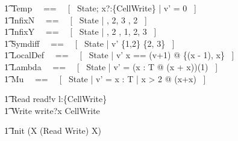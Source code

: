 \begin{circusaction}
    \t1 Temp ~~==~~ [~ \Delta State; x?:\{CellWrite\} | v' = 0 ~] \\
    \t1 InfixN ~~==~~ [~ \Xi State | , 2, 3 \rangle \infix {}, 2 \rangle ~] \\
    \t1 InfixY ~~==~~ [~ \Xi State | , 2 \rangle \infix {}, 1, 2, 3 \rangle ~] \\
    \t1 Symdiff ~~==~~ [~ \Delta State | v' \in \{1,2\} \symdiff \{2, 3\} ~] \\
    \t1 LocalDef ~~==~~ [~ \Delta State | v' \in \LET x == (v+1) @ \{(x - 1), x\} ~] \\
    \t1 Lambda ~~==~~ [~ \Delta State | v' = (\lambda x : T @ (x + x))(1) ~] \\
    \t1 Mu ~~==~~ [~ \Delta State | v' = \mu x : T | x > 2 @ (x+x) ~] \\
\end{circusaction}

\begin{circusaction}
        \t1 Read \circdef read!v \then \Skip \circseq \circvar l:\{CellWrite\} \circspot \Skip\\
        \t1 Write \circdef write?x \then \lschexpract CellWrite \rschexpract \\
\end{circusaction}

\begin{circusaction}
        \t1 \circspot \lschexpract Init \rschexpract \circseq (\circmu X \circspot (Read \extchoice Write) \circseq X) \\ 
\end{circusaction}

\begin{circus}
	\circend
\end{circus}
